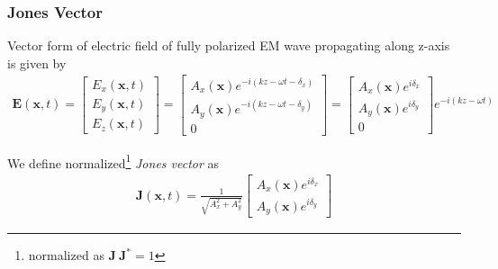 \documentclass[11pt,a4paper]{article}
\numberwithin{equation}{section}
\begin{document}
\subsubsection{Jones Vector}
Vector form of electric field of fully polarized EM wave propagating along z-axis is given by
\begin{align}
	\boldsymbol{E}(\boldsymbol{x},t)=
	\begin{bmatrix}
		E_x(\boldsymbol{x},t)\\
		E_y(\boldsymbol{x},t)\\
		E_z(\boldsymbol{x},t)
	\end{bmatrix} =
\begin{bmatrix}
	A_x(\boldsymbol{x}) e^{-i(kz-\omega t-\delta_x)}\\
	A_y(\boldsymbol{x}) e^{-i(kz-\omega t-\delta_y)}\\
	0
\end{bmatrix}=
\begin{bmatrix}
	A_x(\boldsymbol{x})e^{i\delta_x}\\
	A_y(\boldsymbol{x})e^{i\delta_y}\\
	0
\end{bmatrix}e^{-i(kz-\omega t)}
\end{align}

We define normalized\footnote{normalized as $\boldsymbol{J}\:\boldsymbol{J}^\ast=1$} \textit{Jones vector} as
\begin{align}
	\boldsymbol{J}(\boldsymbol{x},t)=\frac{1}{\sqrt{A_x^2+A_y^2}}
	\begin{bmatrix}
		A_x(\boldsymbol{x})e^{i\delta_x}\\
		A_y(\boldsymbol{x})e^{i\delta_y}
	\end{bmatrix}
\end{align}
\end{document}
